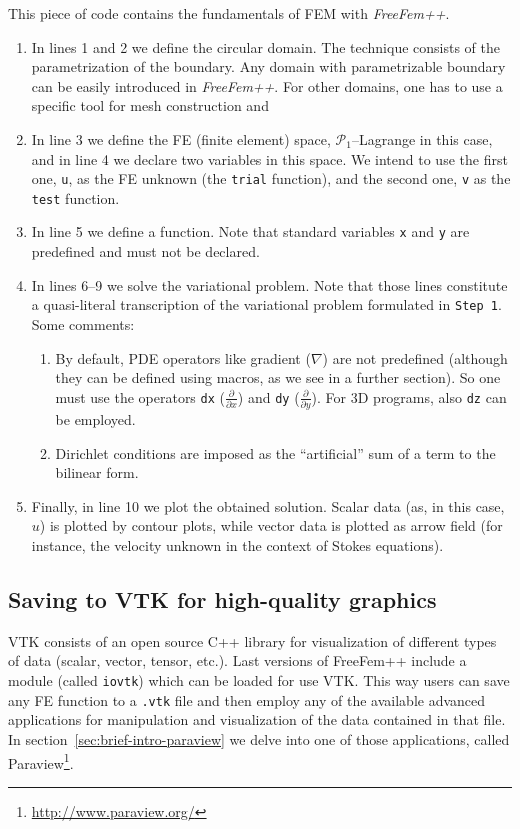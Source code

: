 \documentclass[12pt]{article}
\newcommand{\FF}{\textit{FreeFem++}\xspace}
\renewcommand{\P}{\mathcal{P}_}
\begin{document}
This piece of code contains the fundamentals of FEM with \FF.
\begin{enumerate}
\item In lines 1 and 2 we define the circular domain. The technique
  consists of the parametrization of the boundary. Any domain with
  parametrizable boundary can be easily introduced in \FF.  For other
  domains, one has to use a specific tool for mesh construction and
\item In line 3 we define the FE (finite element) space,
  $\P1$--Lagrange in this case, and in line 4 we declare two variables
  in this space. We intend to use the first one, \texttt{u}, as the FE
  unknown (the \texttt{trial} function), and the second one, \texttt{v}
  as the \texttt{test} function.
\item In line 5 we define a function. Note that standard variables
  \texttt{x} and \texttt{y} are predefined and must not be declared.
\item In lines 6--9 we solve the variational problem. Note that those
  lines constitute a quasi-literal transcription of the variational
  problem formulated in \texttt{Step 1}. Some comments:
  \begin{enumerate}
  \item By default, PDE operators like gradient ($\nabla$) are not
    predefined (although they can be defined using macros, as we see
    in a further section). So one must use the operators \texttt{dx}
    ($\frac{\partial}{\partial x}$) and \texttt{dy}
    ($\frac{\partial}{\partial y}$). For 3D programs, also \texttt{dz}
    can be employed.
  \item Dirichlet conditions are imposed as the ``artificial'' sum of
    a term to the bilinear form.
  \end{enumerate}

\item Finally, in line 10 we plot the obtained solution. Scalar data
  (as, in this case, $u$) is plotted by contour plots, while vector
  data is plotted as arrow field (for instance, the velocity unknown
  in the context of Stokes equations).
\end{enumerate}


\subsection{Saving to VTK for high-quality graphics}

VTK consists of an open source C++ library for visualization of
different types of data (scalar, vector, tensor, etc.). Last versions
of FreeFem++ include a module (called \texttt{iovtk}) which can be
loaded for use VTK. This way users can save any FE function to a
\texttt{.vtk} file and then employ any of the available advanced
applications for manipulation and visualization of the data contained
in that file. In section~\ref{sec:brief-intro-paraview} we delve into
one of those applications, called
Paraview\footnote{\url{http://www.paraview.org/}}.
\end{document}
